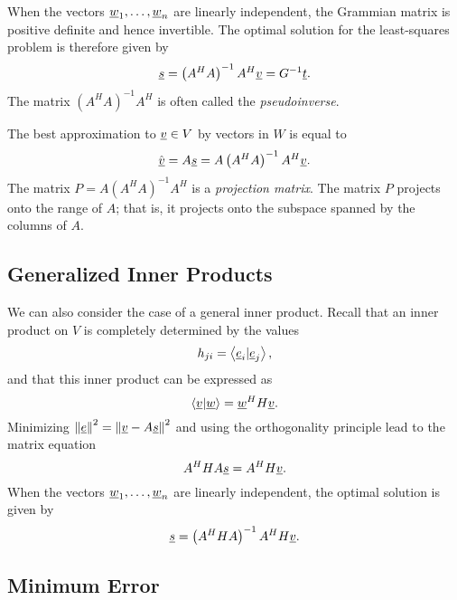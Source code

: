 When the vectors $\underline{w}_1, \ldots, \underline{w}_n$ are linearly independent, the Grammian matrix is positive definite and hence invertible.
The optimal solution for the least-squares problem is therefore given by
\begin{equation*}
\underline{s} = \left( A^H A \right)^{-1} A^H \underline{v} = G^{-1} \underline{t} .
\end{equation*}
The matrix $\left( A^H A \right)^{-1} A^H$ is often called the \emph{pseudoinverse}.

The best approximation to $\underline{v} \in V$ by vectors in $W$ is equal to
\begin{equation*}
\hat{\underline{v}} = A \underline{s} = A \left( A^H A \right)^{-1} A^H \underline{v} .
\end{equation*}
The matrix $P = A \left( A^H A \right)^{-1} A^H$ is a \emph{projection matrix}.
The matrix $P$ projects onto the range of $A$; that is, it projects onto the subspace spanned by the columns of $A$.


\subsection{Generalized Inner Products}

We can also consider the case of a general inner product.
Recall that an inner product on $V$ is completely determined by the values
\begin{equation*}
h_{ji} = \left\langle \underline{e}_i | \underline{e}_j \right\rangle ,
\end{equation*}
and that this inner product can be expressed as
\begin{equation*}
\left\langle \underline{v} | \underline{w} \right\rangle
= \underline{w}^H H \underline{v}.
\end{equation*}
Minimizing $\left\| \underline{e} \right\|^2 = \left\| \underline{v} - A \underline{s} \right\|^2$ and using the orthogonality principle lead to the matrix equation
\begin{equation*}
A^H H A \underline{s} = A^H H \underline{v}.
\end{equation*}
When the vectors $\underline{w}_1, \ldots, \underline{w}_n$ are linearly independent, the optimal solution is given by
\begin{equation*}
\underline{s} = \left( A^H H A \right)^{-1} A^H H \underline{v}.
\end{equation*}


\subsection{Minimum Error}

